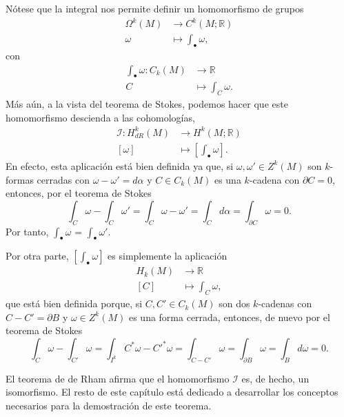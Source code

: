 \documentclass[12pt,a4paper]{book}
\theoremstyle{definition} \newtheorem{defn}[thm]{Definición}
\theoremstyle{definition} \newtheorem{ejemplo}[thm]{Ejemplo}
\theoremstyle{definition} \newtheorem{ejercicio}[thm]{Ejercicio}
\theoremstyle{remark} \newtheorem*{obs}{Observación}
\def\RR{\mathbb{R}}
\begin{document}
	  Nótese que la integral nos permite definir un homomorfismo de grupos
	  \begin{align*}
	     \Omega^k(M)&\longrightarrow C^k(M;\RR)\\ 
	      \omega &\longmapsto \int_\bullet \omega, 
	    \end{align*}
	    con 
	    \begin{align*}
	      \int_\bullet \omega :C_k(M)&\longrightarrow \RR\\ 
	        C &\longmapsto \int_C \omega. 
	      \end{align*}
	      Más aún, a la vista del teorema de Stokes, podemos hacer que este homomorfismo descienda a las cohomologías,
	      \begin{align*}
		\mathcal{I}:	H_{dR}^k(M)&\longrightarrow H^k(M; \RR)\\ 
		[\omega] &\longmapsto \left[\int_\bullet \omega\right]. 
		\end{align*}
		En efecto, esta aplicación está bien definida ya que, si $\omega, \omega' \in Z^k(M)$ son $k$-formas cerradas con $\omega-\omega'=d\alpha$ y $C\in C_k(M)$ es una $k$-cadena con $\partial C=0$, entonces, por el teorema de Stokes
		\begin{equation*}
		  \int_C \omega - \int_C \omega' = \int_C \omega-\omega' = \int_C d\alpha = \int_{\partial C} \omega =0.
		\end{equation*}
		Por tanto, $\int_\bullet \omega$ = $\int_\bullet \omega'$.

		Por otra parte, $\left[ \int_\bullet \omega \right]$ es simplemente la aplicación
		\begin{align*}
		  H_k(M) &\longrightarrow \RR\\ 
		  [C] &\longmapsto \int_C \omega, 
		  \end{align*}
		  que está bien definida porque, si $C,C'\in C_k(M)$ son dos $k$-cadenas con $C-C'=\partial B$ y $\omega \in Z^k(M)$ es una forma cerrada, entonces, de nuevo por el teorema de Stokes
		  \begin{equation*}
		    \int_C \omega - \int_{C'}\omega = \int_{I^k} C^*\omega - C'^*\omega = \int_{C-C'} \omega=\int_{\partial B} \omega = \int_{B} d\omega =0.
		  \end{equation*}
		  
		  El teorema de de Rham afirma que el homomorfismo $\mathcal{I}$ es, de hecho, un isomorfismo. El resto de este capítulo está dedicado a desarrollar los conceptos necesarios para la demostración de este teorema.
\end{document}
